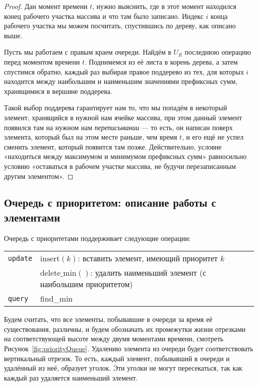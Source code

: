 \begin{proof}
	Дан момент времени $t$, нужно выяснить, где в этот момент находился конец рабочего участка массива и что там было записано. Индекс $i$ конца рабочего участка мы можем посчитать, спустившись по дереву, как описано выше.

	Пусть мы работаем с правым краем очереди. Найдём в $U_R$ последнюю операцию перед моментом времени $t$. Поднимемся из её листа в корень дерева, а затем спустимся обратно, каждый раз выбирая правое поддерево из тех, для которых $i$ находится между наибольшим и наименьшим значениями префиксных сумм, хранящимися в вершине поддерева.

	Такой выбор поддерева гарантирует нам то, что мы попадём в некоторый элемент, хранящийся в нужной нам ячейке массива, при этом данный элемент появился там на нужном нам {\it переписывании} — то есть, он написан поверх элемента, который был на этом месте раньше, чем время $t$, и его ещё не успел сменить элемент, который появится там позже. Действительно, условие «находиться между максимумом и минимумом префиксных сумм» равносильно условию «оставаться в рабочем участке массива, не будучи перезаписанным другим элементом».
\end{proof}

\subsection{Очередь с приоритетом: описание работы с элементами}

Очередь с приоритетами поддерживает следующие операции:

\begin{center} \begin{tabular}{ll}
	{\tt update} & $\text{insert} (k)$: вставить элемент, имеющий приоритет $k$ \\
		& $\text{delete\_min} ()$: удалить наименьший элемент (с наибольшим приоритетом) \\
	{\tt query} & find\_min
\end{tabular} \end{center}

Будем считать, что все элементы, побывавшие в очереди за время её существования, различны, и будем обозначать их промежутки жизни отрезками на соответствующей высоте между двумя моментами времени, смотреть Рисунок~\ref{fig:priorityQueue}. Удалению элемента из очереди будет соответствовать вертикальный отрезок. То есть, каждый элемент, побывавший в очереди и удалённый из неё, образует уголок. Эти уголки не могут пересекаться, так как каждый раз удаляется наименьший элемент.

